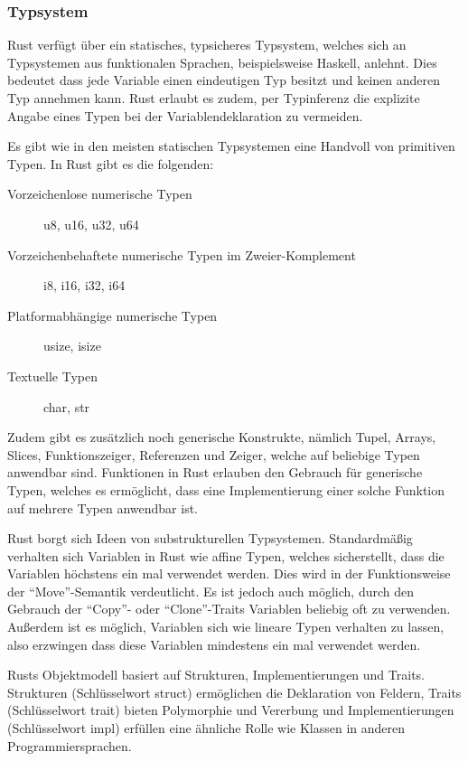 \subsubsection{Typsystem}

Rust verfügt über ein statisches, typsicheres Typsystem, welches sich an Typsystemen aus funktionalen Sprachen, beispielsweise Haskell, anlehnt\cite{rustWikiDe}. Dies bedeutet dass jede Variable einen eindeutigen Typ besitzt und keinen
anderen Typ annehmen kann. Rust erlaubt es zudem, per Typinferenz die explizite Angabe eines Typen bei der Variablendeklaration zu
vermeiden\cite{rustWikiDe}.

Es gibt wie in den meisten statischen Typsystemen eine Handvoll von primitiven Typen. In Rust gibt es die folgenden\cite{rustTypes}:

\begin{description}
	\item[Vorzeichenlose numerische Typen] u8, u16, u32, u64
	\item[Vorzeichenbehaftete numerische Typen im Zweier-Komplement] i8, i16, i32, i64
	\item[Platformabhängige numerische Typen] usize, isize
	\item[Textuelle Typen] char, str
\end{description}

Zudem gibt es zusätzlich noch generische Konstrukte, nämlich Tupel, Arrays, Slices, Funktionszeiger, Referenzen und Zeiger, welche
auf beliebige Typen anwendbar sind\cite{rustTypes}. Funktionen in Rust erlauben den Gebrauch für generische Typen, welches es
ermöglicht, dass eine Implementierung einer solche Funktion auf mehrere Typen anwendbar ist.

Rust borgt sich Ideen von substrukturellen Typsystemen\cite{linearTypePain}. Standardmäßig verhalten sich Variablen in Rust wie
affine Typen, welches sicherstellt, dass die Variablen höchstens ein mal verwendet werden\cite{substructuralTypesWikiEn}.
Dies wird in der Funktionsweise der "`Move"'-Semantik verdeutlicht\cite{linearTypePain}.
Es ist jedoch auch möglich, durch den Gebrauch der "`Copy"'- oder "`Clone"'-Traits Variablen
beliebig oft zu verwenden\cite{linearTypePain}.
Außerdem ist es möglich, Variablen sich wie lineare Typen verhalten zu lassen, also erzwingen dass diese Variablen mindestens
ein mal verwendet werden\cite{linearTypePain}.

Rusts Objektmodell basiert auf Strukturen, Implementierungen und Traits\cite{rustWikiEn}.
Strukturen (Schlüsselwort struct) ermöglichen die Deklaration von Feldern\cite{rustWikiEn}, 
Traits (Schlüsselwort trait) bieten Polymorphie und Vererbung
\cite{rustWikiEn} und Implementierungen (Schlüsselwort impl) erfüllen eine ähnliche Rolle wie Klassen in
anderen Programmiersprachen\cite{rustWikiEn}.

